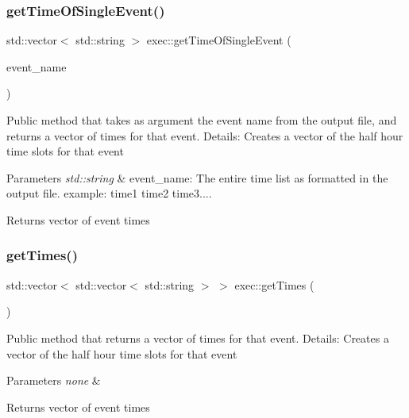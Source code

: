 \subsubsection{\texorpdfstring{get\+Time\+Of\+Single\+Event()}{getTimeOfSingleEvent()}}
{\footnotesize\ttfamily std\+::vector$<$ std\+::string $>$ exec\+::get\+Time\+Of\+Single\+Event (\begin{DoxyParamCaption}\item[{std\+::string}]{event\+\_\+name }\end{DoxyParamCaption})}

Public method that takes as argument the event name from the output file, and returns a vector of times for that event. Details\+: Creates a vector of the half hour time slots for that event 
\begin{DoxyParams}{Parameters}
{\em std\+::string} & event\+\_\+name\+: The entire time list as formatted in the output file. example\+: time1 time2 time3.... \\
\hline
\end{DoxyParams}
\begin{DoxyReturn}{Returns}
vector of event times 
\end{DoxyReturn}
\mbox{\label{classexec_a4ca78729a8eabc233fd936948c85565e}} 
\subsubsection{\texorpdfstring{get\+Times()}{getTimes()}}
{\footnotesize\ttfamily std\+::vector$<$ std\+::vector$<$ std\+::string $>$ $>$ exec\+::get\+Times (\begin{DoxyParamCaption}{ }\end{DoxyParamCaption})}

Public method that returns a vector of times for that event. Details\+: Creates a vector of the half hour time slots for that event 
\begin{DoxyParams}{Parameters}
{\em none} & \\
\hline
\end{DoxyParams}
\begin{DoxyReturn}{Returns}
vector of event times 
\end{DoxyReturn}
\mbox{\label{classexec_ade14fc20cd40b2d5e3e8e5abbda382d4}} 
